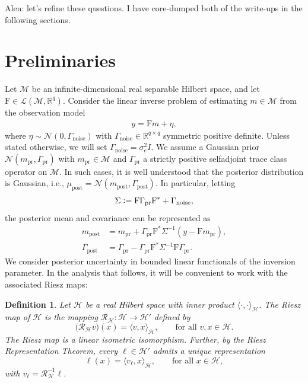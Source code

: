 \documentclass[ba]{imsart}
\theoremstyle{plain}
\newtheorem{definition}[theorem]{Definition}
\newcommand{\defeq}{\vcentcolon=}
\newcommand{\GM}[2]{\mathcal{N}\!\left( {#1}, {#2}\right)}
\newcommand{\obs}{{y}}
\newcommand{\prcov}{\Gamma_{\mathrm{pr}}}
\newcommand{\postcov}{\Gamma_{\mathrm{post}}}
\newcommand{\noise}{\Gamma_{\mathrm{noise}}}
\newcommand{\R}{\mathbb{R}}
\newcommand{\F}{\mathrm{F}}
\newcommand{\dpar}{{m}}
\newcommand{\dparpr}{\dpar_{\mathrm{pr}}}
\newcommand{\dparpost}{\dpar_{\mathrm{post}}}
\newcommand{\postm}{\mu_{\mathrm{post}}}
\newcommand{\ip}[2]{\langle {#1}, {#2}\rangle}
\newcommand{\Gammay}{\Sigma}
\newcommand{\hilb}{\mathcal{H}}
\newcommand{\M}{\mathcal{M}}
\newcommand{\RR}{\mathcal{R}}
\begin{document}
Alen: let's refine these questions. I have core-dumped both of the write-ups in the 
following sections. 

\section{Preliminaries}

Let $\M$ be an infinite-dimensional real separable Hilbert space, and let
$\F\in \mathcal{L}(\M,\R^q)$.
Consider the linear inverse problem of estimating $\dpar \in \M$ from the observation 
model
\begin{align}
    \obs = \F \dpar + {\eta},\label{eq:fwd}
\end{align}
where ${\eta} \sim \GM{0}{\noise}$ with $\noise\in\R^{q\times q}$ symmetric
positive definite. Unless stated otherwise, we will set $\noise=\sigma_e^2I$. We assume a Gaussian prior 
$\GM{\dparpr}{\prcov}$
with $\dparpr\in\M$ and 
$\prcov$ a strictly positive selfadjoint trace class operator on $\M$.
In such cases, it is well understood that the posterior distribution is Gaussian, i.e.,  
$\postm = \GM{\dparpost}{\postcov}$. 
In particular, 
letting 
\begin{equation}\label{equ:Gammay}
\Sigma \defeq \F\prcov\F^*+\noise,
\end{equation} 
the posterior mean and covariance can be represented as 
\begin{equation}
\begin{aligned}
    \dparpost &= \dparpr + \prcov \F^* \Gammay^{-1} (\obs-\F\dparpr),
    \\
    \postcov &= \prcov - \prcov \F^* \Gammay^{-1} \F\prcov.\label{eq: postcov}
\end{aligned}
\end{equation}
We consider posterior uncertainty in bounded linear functionals 
of the inversion parameter. 
In the analysis that follows, it will be convenient to work 
with the associated Riesz maps:
\begin{definition}
Let $\hilb$ be a real Hilbert space with inner product
$\ip{\cdot}{\cdot}_{\hilb}$.
The \emph{Riesz map} of $\hilb$ is the mapping
$\RR_{\hilb}:\hilb\to\hilb'$
defined by
\[
\bigl(\RR_{\hilb}v\bigr)(x)
=
\ip{v}{x}_{\hilb},
\qquad \text{for all } v,x\in\hilb.
\]
The Riesz map is a linear isometric isomorphism.
Further, by the Riesz Representation Theorem,
every $\ell\in\hilb'$ admits a unique representation
\[
\ell(x)=\ip{v_\ell}{x}_{\hilb},
\qquad \text{for all } x\in\hilb,
\]
with $v_\ell=\RR_{\hilb}^{-1}\ell$.
\end{definition}
\end{document}
